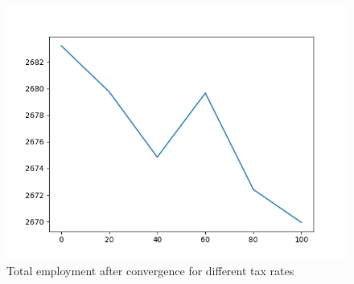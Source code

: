 \begin{figure}
    \centering
    \includegraphics{Results/images/Figure_2.png}
    \caption{Total employment after convergence for different tax rates}
    \label{fig:prop_e}
\end{figure}